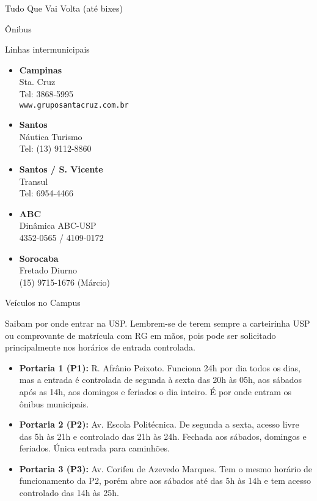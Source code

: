 \begin{secao}{Tudo Que Vai Volta (até bixes)}
\begin{subsecao}{Ônibus}
\begin{subsubsecao}{Linhas intermunicipais}
\begin{itemize}
  \item {\bf Campinas}\\
    Sta. Cruz\\
    Tel: 3868-5995\\
    {\tt www.gruposantacruz.com.br}

  \item {\bf Santos}\\
    Náutica Turismo\\
    Tel: (13) 9112-8860

  \item {\bf Santos / S. Vicente}\\
    Transul\\
    Tel: 6954-4466

  \item {\bf ABC}\\
    Dinâmica ABC-USP\\
    4352-0565 / 4109-0172

  \item {\bf Sorocaba}\\
    Fretado Diurno\\
    (15) 9715-1676 (Márcio)

\end{itemize}

\end{subsubsecao}

\end{subsecao}


\begin{subsecao}{Veículos no Campus}

Saibam por onde entrar na USP. Lembrem-se de terem sempre a carteirinha USP ou
comprovante de matrícula com RG em mãos, pois pode ser solicitado principalmente
nos horários de entrada controlada.
\begin{itemize}
  \item {\bf Portaria 1 (P1):} R. Afrânio Peixoto. Funciona 24h por dia todos os
    dias, mas a entrada é controlada de segunda à sexta das 20h às 05h, aos sábados
    após as 14h, aos domingos e feriados o dia inteiro. É por onde entram os
    ônibus municipais.

  \item {\bf Portaria 2 (P2):} Av. Escola Politécnica. De segunda a sexta, acesso
  livre das 5h às 21h e controlado das 21h às 24h. Fechada aos sábados, domingos
  e feriados. Única entrada para caminhões.

  \item {\bf Portaria 3 (P3):} Av. Corifeu de Azevedo Marques. Tem o mesmo horário
    de funcionamento da P2, porém abre aos sábados até das 5h às 14h e tem acesso
    controlado das 14h às 25h.


\end{itemize}
\end{subsecao}
\end{secao}
